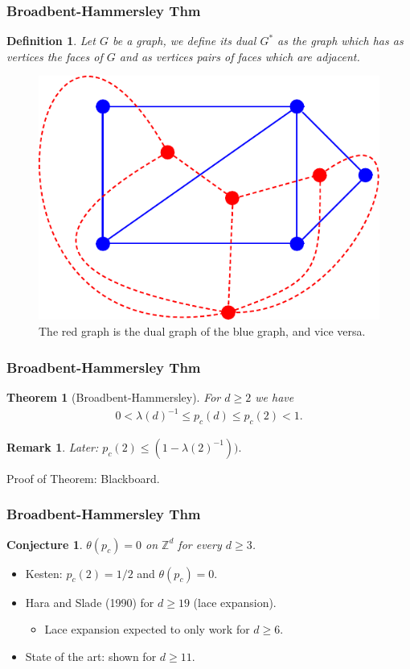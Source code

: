 \documentclass[compress,mathserif,serif]{beamer}
\newtheorem{thm}{Theorem}
\newtheorem{dfn}{Definition}
\newtheorem{conn}{Conjecture}
\newtheorem{rem}{Remark}
\begin{document}
\begin{frame}
\frametitle{Broadbent-Hammersley Thm}
\begin{dfn} Let $G$ be a graph, we define its dual $G^*$ as the graph which has as vertices the faces of $G$ and as vertices pairs of faces which are adjacent. 
\end{dfn}
\begin{figure}[hbtp]
\centering
\includegraphics[scale=0.5]{Duals_graphs.pdf}
\caption{The red graph is the dual graph of the blue graph, and vice versa.}
\end{figure}

\end{frame}

\begin{frame}
\frametitle{Broadbent-Hammersley Thm}
\begin{thm}[Broadbent-Hammersley] For $d \geq 2$ we have 
\begin{align*}
0 < \lambda(d)^{-1} \leq p_c(d) \leq p_c(2) <1.
\end{align*}
\end{thm}
\pause
\begin{rem} Later: $p_c(2) \leq (1-\lambda(2)^{-1})).$
\end{rem}
Proof of Theorem: Blackboard.
\end{frame}

\begin{frame}
\frametitle{Broadbent-Hammersley Thm}
\begin{conn}$\theta(p_c)=0$ on $\mathbb{Z}^d$ for every $d \geq 3$.
\end{conn}
\pause
\begin{itemize}
\item Kesten: $p_c(2)=1/2$ and $\theta(p_c)=0$.
\pause
\item Hara and Slade (1990) for $d \geq 19$ (lace expansion).
\pause
\begin{itemize}
\item Lace expansion expected to only work for $d \geq 6$.
\end{itemize}
\pause
\item State of the art: shown for $d \geq 11$.
\end{itemize}
\end{frame}
\end{document}
